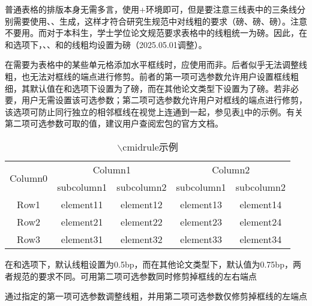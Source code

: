 \documentclass[doctor, vlined]{DissertUESTC}
\begin{document}
	普通表格的排版本身无需多言，使用+环境即可，但是要注意三线表中的三条线分别需要使用、、生成，这样才符合研究生规范中对线粗的要求（磅、磅、磅）。注意不要用。而对于本科生，学士学位论文规范要求表格中的线粗统一为磅。因此，在和选项下，、、和的线粗均设置为磅（2025.05.01调整）。
	
	在需要为表格中的某些单元格添加水平框线时，应使用\newline{}而非。后者似乎无法调整线粗，也无法对框线的端点进行修剪。前者的第一项可选参数允许用户设置框线粗细，其默认值在和选项下设置为了磅，而在其他论文类型下设置为了磅。若非必要，用户无需设置该可选参数；第二项可选参数允许用户对框线的端点进行修剪，该选项可防止同行独立的相邻框线在视觉上连通到一起，参见表\ref{tab: cmidrule示例}中的示例。有关第二项可选参数可取的值，建议用户查阅\href{https://mirrors.sustech.edu.cn/CTAN/macros/latex/contrib/booktabs/booktabs.pdf}{\ttfamily\color{DarkRed}}宏包的官方文档。
	
	\begin{table}[htp]
		\caption{$\backslash$cmidrule示例}\label{tab: cmidrule示例}
		\begin{threeparttable}
			\begin{tabular}{ccccc}
				\toprule
				\multirow{2}{*}{Column0} &  \multicolumn{2}{c}{Column1\tnote{1}} & \multicolumn{2}{c}{Column2\tnote{2}} \\
				\cmidrule(lr){2-3}\cmidrule[2.5bp](l){4-5}
				~     & subcolumn1 & subcolumn2 & subcolumn1 & subcolumn2 \\
				\midrule
				Row1  & element11 & element12 &element13 & element14 \\
				Row2  & element21 & element22 &element23 & element24 \\
				\cmidrule{2-3}\cmidrule[2.5bp]{4-5}
				Row3  & element31 & element32 &element33 & element34 \\
				\bottomrule
			\end{tabular}
			\begin{tablenotes}
				\item[1] 在和选项下，默认线粗设置为0.5bp，而在其他论文类型下，默认值为0.75bp，两者规范的要求不同。可用第二项可选参数同时修剪掉框线的左右端点
				\item[2] 通过指定的第一项可选参数调整线粗，并用第二项可选参数仅修剪掉框线的左端点
			\end{tablenotes}
		\end{threeparttable}
	\end{table}
\end{document}
